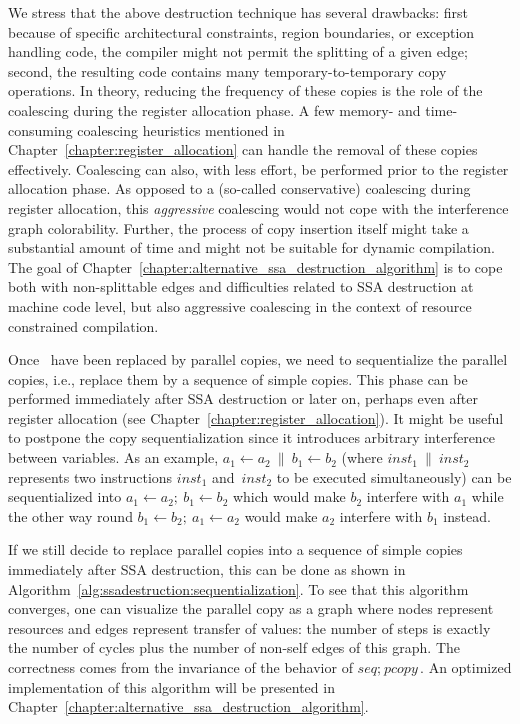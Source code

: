 {We stress that the above destruction technique has several drawbacks: first because of specific architectural constraints, region boundaries, or exception handling code, the compiler might not permit the splitting of a given edge; second, the resulting code contains many temporary-to-temporary copy operations. In theory, reducing the frequency of these copies is the role of the coalescing during the register allocation phase. A few memory- and time-consuming coalescing heuristics mentioned in Chapter~\ref{chapter:register_allocation} can handle the removal of these copies effectively. Coalescing can also, with less effort, be performed prior to the register allocation phase. As opposed to a (so-called conservative) coalescing during register allocation, this \emph{aggressive} coalescing would not cope with the interference graph colorability. Further, the process of copy insertion itself might take a substantial amount of time and might not be suitable for dynamic compilation. The goal of Chapter~\ref{chapter:alternative_ssa_destruction_algorithm} is to cope both with non-splittable edges and difficulties related to SSA destruction at machine code level, but also aggressive coalescing in the context of resource constrained compilation.

Once \phifuns\ have been replaced by parallel copies, we need to sequentialize the parallel copies, i.e., replace them by a sequence of simple copies. This phase can be performed immediately after SSA destruction or later on, perhaps even after register allocation (see Chapter~\ref{chapter:register_allocation}). It might be useful to postpone the copy sequentialization since it introduces arbitrary interference between variables. As an example, $a_1\gets a_2\ \parallel\ b_1\gets b_2$ (where $\textit{inst}_1\ \parallel\ \textit{inst}_2$ represents two instructions $\textit{inst}_1$ and~$\textit{inst}_2$ to be executed simultaneously) can be sequentialized into $a_1\gets a_2;\ b_1\gets b_2$ which would make $b_2$ interfere with $a_1$ while the other way round $b_1\gets b_2;\ a_1\gets a_2$ would make $a_2$ interfere with $b_1$ instead.

If we still decide to replace parallel copies into a sequence of
simple copies immediately after SSA destruction, this can be done as
shown in Algorithm~\ref{alg:ssadestruction:sequentialization}.
%
To see that this algorithm converges, one can visualize the parallel copy as a graph where nodes represent resources and edges represent transfer of values: the number of steps is exactly the number of cycles plus the number of non-self edges of this graph. The correctness comes from the invariance of the behavior of $\textit{seq};\ \textit{pcopy}$. An optimized implementation of this algorithm will be presented in Chapter~\ref{chapter:alternative_ssa_destruction_algorithm}.

}
